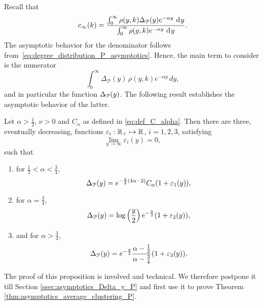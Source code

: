 Recall that
\[
	c_\infty(k) = \frac{\int_0^\infty \rho(y,k) \Delta_{{\mathcal P}}(y) e^{-\alpha y} \operatorname{\, \mathrm{d}\hspace{-1pt}} y}{\int_0^\infty \rho(y,k) e^{-\alpha y} \operatorname{\, \mathrm{d}\hspace{-1pt}} y}.
\]
The asymptotic behavior for the denominator follows from~\eqref{eq:degree_distribution_P_asymptotics}. Hence, the main term to consider is the numerator
\[
	\int_0^{\infty} \Delta_{\mathcal{P}}(y) \, \rho(y,k) e^{-\alpha y} \, dy,
\]
and in particular the function $\Delta_{{\mathcal P}}(y)$. The following result establishes the asymptotic behavior of the latter.

\begin{proposition}\label{prop:asymptotics_Delta_y_P}
Let $\alpha > \frac{1}{2}$, $\nu > 0$ and $C_\alpha$ as defined in \eqref{eq:def_C_alpha}. Then there are three, eventually decreasing, functions $\varepsilon_i : {\mathbb R}_+ \mapsto {\ensuremath{\mathbb R}}$, $i = 1,2,3$, satisfying
\[
	\lim_{y \to \infty} \varepsilon_i(y) = 0, 
\]
such that 
\begin{enumerate}
\item for $\frac{1}{2} < \alpha < \frac{3}{4}$,
\[
	\Delta_{{\mathcal P}}(y) = e^{-\frac{y}{2}(4\alpha - 2)} C_\alpha (1 + \varepsilon_1(y)),
\]
\item for $\alpha = \frac{3}{4}$,
\[
	\Delta_{{\mathcal P}}(y) = \log\left(\frac{y}{2}\right)e^{-\frac{y}{2}}(1 + \varepsilon_2(y)),
\]
\item and for $\alpha > \frac{3}{4}$,
\[
	\Delta_{{\mathcal P}}(y) = e^{-\frac{y}{2}} \frac{\alpha - \frac{1}{2}}{\alpha - \frac{3}{4}} (1 + \varepsilon_3(y)).
\]
\end{enumerate}
\end{proposition}

The proof of this proposition is involved and technical. We therefore postpone it till Section \ref{ssec:asymptotics_Delta_y_P} and first use it to prove Theorem \ref{thm:asymptotics_average_clustering_P}. 

